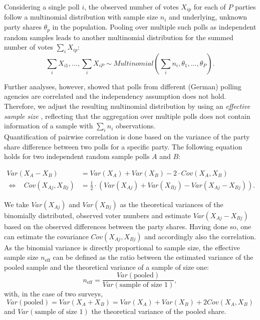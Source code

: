 \documentclass[smallcondensed]{svjour3}     %
\begin{document}
Considering a single poll $i$, the observed number of votes $X_{ip}$ for each of
$P$ parties follow a multinomial distribution with sample size $n_i$ and underlying,
unknown party shares $\theta_p$ in the population.
Pooling over multiple such polls as independent random samples leads to another
multinomial distribution for the summed number of votes $\sum_i X_{ip}$:
\begin{equation}
\sum\limits_i X_{i1},\ldots, \sum\limits_i X_{iP}
  \sim Multinomial \left( \sum\limits_i n_i,\theta_1,\ldots,\theta_P\right).
\end{equation}

Further analyses, however, showed that polls from different (German)
polling agencies are correlated
and the independency assumption does not hold.
Therefore, we adjust the resulting multinomial
distribution by using an \textit{effective sample size} \citep{hanley_2003},
reflecting that the aggregation over multiple polls does not contain
information of a sample with $\sum_i n_i$ observations.\\

Quantification of pairwise correlation is done based on the variance of the
party share difference between two polls for a specific party.
The following equation holds for two independent
random sample polls $A$ and $B$:

\begin{equation}
\begin{aligned}
Var(X_A - X_B) &= Var(X_A) + Var(X_B) - 2 \cdot Cov(X_A, X_B) \\
\Leftrightarrow \ \ \ \ Cov(X_{Aj}, X_{Bj}) &= \frac{1}{2} \cdot \left(Var(X_{Aj}) + Var(X_{Bj}) - Var(X_{Aj} - X_{Bj}) \right).
\end{aligned}
\end{equation}

We take $Var(X_{Aj})$ and $Var(X_{Bj})$ as the theoretical variances of the binomially distributed, observed voter numbers and estimate $Var(X_{Aj} - X_{Bj})$ based on the observed differences between the party shares. Having done so, one can estimate the covariance $Cov(X_{Aj}, X_{Bj})$ and accordingly also the correlation. As the binomial variance is directly proportional to sample size, the effective sample size $n_{\text{eff}}$ can be defined as the ratio between the estimated variance of the pooled sample and the theoretical variance of a sample of size one:
$$
n_{\text{eff}} = \frac{Var(\text{pooled})}{Var(\text{sample of size 1})},
$$
with, in the case of two surveys,
$$
Var(\text{pooled}) = Var(X_A + X_B) = Var(X_A) + Var(X_B) + 2 Cov(X_A,X_B)
$$
and $Var(\text{sample of size 1})$ the theoretical variance of the pooled share.
\end{document}
